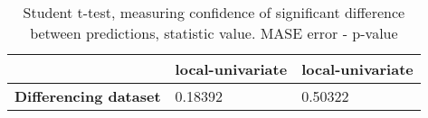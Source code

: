 \begin{table}[H]
\centering
\caption{Student t-test, measuring confidence of significant difference between predictions, statistic value. MASE error - p-value}
\label{table:ttest-p-values-differencing-experiments-MASE}
\begin{tabular}{lll}
\toprule
{} & local-univariate & local-univariate \\
\midrule
\textbf{Differencing dataset} &          0.18392 &          0.50322 \\
\bottomrule
\end{tabular}
\end{table}
